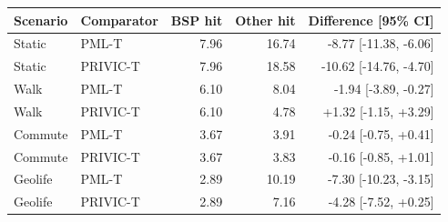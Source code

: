 \begin{tabular}{llrrr}
\toprule
Scenario & Comparator & BSP hit & Other hit & Difference [95\% CI] \\
\midrule
Static & PML-T & 7.96 & 16.74 & -8.77 [-11.38, -6.06] \\
Static & PRIVIC-T & 7.96 & 18.58 & -10.62 [-14.76, -4.70] \\
Walk & PML-T & 6.10 & 8.04 & -1.94 [-3.89, -0.27] \\
Walk & PRIVIC-T & 6.10 & 4.78 & +1.32 [-1.15, +3.29] \\
Commute & PML-T & 3.67 & 3.91 & -0.24 [-0.75, +0.41] \\
Commute & PRIVIC-T & 3.67 & 3.83 & -0.16 [-0.85, +1.01] \\
Geolife & PML-T & 2.89 & 10.19 & -7.30 [-10.23, -3.15] \\
Geolife & PRIVIC-T & 2.89 & 7.16 & -4.28 [-7.52, +0.25] \\
\bottomrule
\end{tabular}